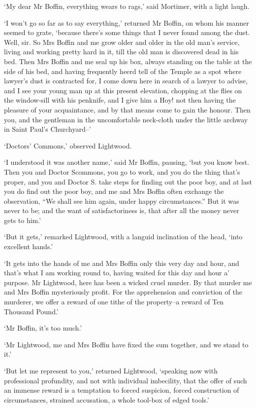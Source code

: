 ‘My dear Mr Boffin, everything wears to rags,’ said Mortimer, with a
light laugh.

‘I won’t go so far as to say everything,’ returned Mr Boffin, on whom
his manner seemed to grate, ‘because there’s some things that I never
found among the dust. Well, sir. So Mrs Boffin and me grow older and
older in the old man’s service, living and working pretty hard in it,
till the old man is discovered dead in his bed. Then Mrs Boffin and me
seal up his box, always standing on the table at the side of his bed,
and having frequently heerd tell of the Temple as a spot where lawyer’s
dust is contracted for, I come down here in search of a lawyer to
advise, and I see your young man up at this present elevation, chopping
at the flies on the window-sill with his penknife, and I give him a Hoy!
not then having the pleasure of your acquaintance, and by that
means come to gain the honour. Then you, and the gentleman in the
uncomfortable neck-cloth under the little archway in Saint Paul’s
Churchyard--’

‘Doctors’ Commons,’ observed Lightwood.

‘I understood it was another name,’ said Mr Boffin, pausing, ‘but you
know best. Then you and Doctor Scommons, you go to work, and you do the
thing that’s proper, and you and Doctor S. take steps for finding out
the poor boy, and at last you do find out the poor boy, and me and Mrs
Boffin often exchange the observation, “We shall see him again,
under happy circumstances.” But it was never to be; and the want of
satisfactoriness is, that after all the money never gets to him.’

‘But it gets,’ remarked Lightwood, with a languid inclination of the
head, ‘into excellent hands.’

‘It gets into the hands of me and Mrs Boffin only this very day and
hour, and that’s what I am working round to, having waited for this day
and hour a’ purpose. Mr Lightwood, here has been a wicked cruel
murder. By that murder me and Mrs Boffin mysteriously profit. For the
apprehension and conviction of the murderer, we offer a reward of one
tithe of the property--a reward of Ten Thousand Pound.’

‘Mr Boffin, it’s too much.’

‘Mr Lightwood, me and Mrs Boffin have fixed the sum together, and we
stand to it.’

‘But let me represent to you,’ returned Lightwood, ‘speaking now with
professional profundity, and not with individual imbecility, that the
offer of such an immense reward is a temptation to forced suspicion,
forced construction of circumstances, strained accusation, a whole
tool-box of edged tools.’

